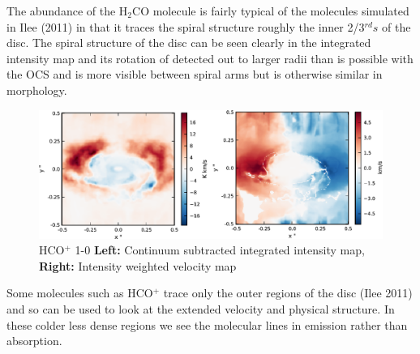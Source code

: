 \documentclass[useAMS,usenatbib]{mn2e}
\begin{document}

The abundance of the H$_2$CO molecule is fairly typical of the molecules simulated in Ilee (2011) in that it traces the spiral structure roughly the inner 2/3$^{rd}s$ of the disc. The spiral structure of the disc can be seen clearly in the integrated intensity map and its rotation of detected out to larger radii than is possible with the OCS and is more visible between spiral arms but is otherwise similar in morphology.

\begin{figure}
  \includegraphics[width=168mm]{Figures/sim/imageHCOp_1-0_30deg_composite_all.eps}  \caption{HCO$^+$ 1-0 {\bf Left:} Continuum subtracted integrated intensity map, {\bf Right:} Intensity weighted velocity map}
  \label{hco+_all}
\end{figure}



Some molecules such as HCO$^+$ trace only the outer regions of the disc (Ilee 2011) and so can be used to look at the extended velocity and physical structure. In these colder less dense regions we see the molecular lines in emission rather than absorption. \newline
\end{document}
